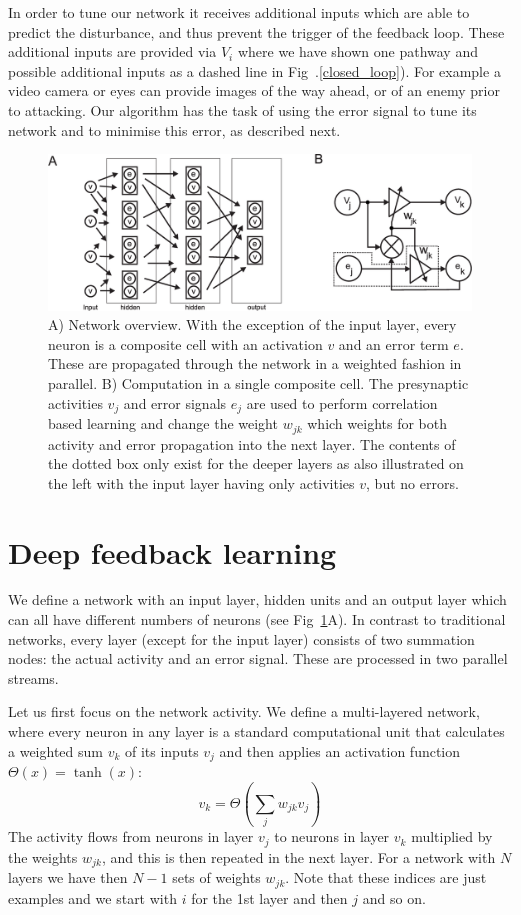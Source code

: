 \documentclass{article}
\begin{document}
In order to tune our network it receives additional inputs which are
able to predict the disturbance, and thus prevent the trigger of the
feedback loop. These additional inputs are provided via $V_i$ where we
have shown one pathway and possible additional inputs as a dashed line
in Fig~.\ref{closed_loop}). For example a video camera or eyes can
provide images of the way ahead, or of an enemy prior to
attacking. Our algorithm has the task of using the error signal to
tune its network and to minimise this error, as described next.

\begin{figure}[!ht]
  \centering
  \includegraphics[width=\columnwidth]{netw_together}
  \caption{A) Network overview. With the exception of the input layer, every
    neuron is a composite cell with an activation $v$ and an error
    term $e$. These are propagated through the network in a weighted
    fashion in parallel.  B) Computation in a single composite cell.
    The presynaptic activities $v_j$ and error signals $e_j$ are used
    to perform correlation based learning and change the weight
    $w_{jk}$ which weights for both activity and error propagation into the next
    layer. The contents of the dotted box only exist for the deeper
    layers as also illustrated on the left with the input layer
    having only activities $v$, but no errors. \label{netw_together}}
\end{figure}


\section{Deep feedback learning}
We define a network with an input layer, hidden units and an output
layer which can all have different numbers of neurons (see
Fig~\ref{netw_together}A). In contrast to traditional
networks, every layer (except for the input layer) consists of two
summation nodes: the actual activity and an error signal. These
are processed in two parallel streams.

Let us first focus on the network activity. We define a multi-layered
network, where every neuron in any layer is a standard computational unit that
calculates a weighted sum $v_k$ of its inputs $v_j$ and then applies
an activation function $\Theta(x) = \tanh(x)$:
\begin{equation}
  v_k = \Theta\left( \sum_j w_{jk} v_{j} \right) \label{act_sum}
\end{equation}
The activity flows from neurons in layer $v_j$ to neurons in
layer $v_k$ multiplied by the weights $w_{jk}$, and this
is then repeated in the next layer. For a network with
$N$ layers we have then $N-1$ sets of weights $w_{jk}$. Note that these
indices are just examples and we start with $i$ for the 1st layer and then
$j$ and so on.
\end{document}
